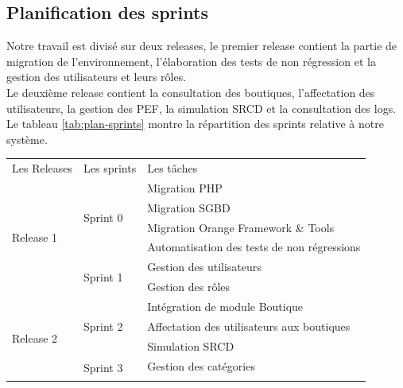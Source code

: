\subsection[Planification des sprints]{Planification des sprints}
Notre travail est divisé sur deux releases, le premier release contient la partie de migration de l’environnement, l’élaboration des tests de non régression et la gestion des utilisateurs et leurs rôles.\\
Le deuxième release contient la consultation des boutiques, l’affectation des utilisateurs, la gestion des PEF, la simulation SRCD et la consultation des logs.\\
\newpage
Le tableau \ref{tab:plan-sprints} montre la répartition des sprints relative à notre système.
\begin{table}[H]
	\centering
	\begin{tabular}{|l|l|l|}
		\hline
		\rowcolor[HTML]{9B9B9B} 
		\multicolumn{3}{|c|}{Répartition des sprints}                                           \\ \hline
		\rowcolor[HTML]{C0C0C0} 
		Les Releases & Les sprints               & Les tâches                                   \\ \hline
		\multirow{6}{*}{Release 1} & \multirow{4}{*}{Sprint 0} & Migration PHP                  \\ \cline{3-3} 
		&                           & Migration SGBD                               \\ \cline{3-3} 
		&                           & Migration Orange Framework \& Tools          \\ \cline{3-3} 
		&                           & Automatisation des tests de non régressions  \\ \cline{2-3} 
		& \multirow{2}{*}{Sprint 1} & Gestion des utilisateurs                     \\ \cline{3-3} 
		&                           & Gestion des rôles                            \\ \hline
		\multirow{9}{*}{Release 2} & \multirow{3}{*}{Sprint 2} & Intégration de module Boutique \\ \cline{3-3} 
		&                           & Affectation des utilisateurs aux boutiques   \\ \cline{3-3} 
		&                           & Simulation SRCD                              \\ \cline{2-3} 
		& \multirow{6}{*}{Sprint 3} & Gestion des catégories                       \\ \cline{3-3} 

\end{tabular}
\end{table}

